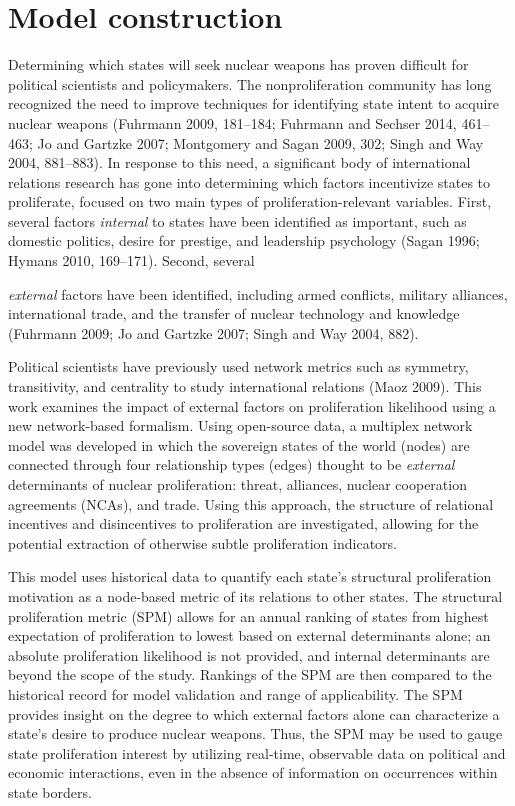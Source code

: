 \documentclass{article} %
\begin{document}
\section{Model construction}
Determining which states will seek nuclear weapons has proven difficult for political scientists and policymakers. The nonproliferation community has long recognized the need to improve techniques for identifying state intent to acquire nuclear weapons (Fuhrmann 2009, 181--184; Fuhrmann and Sechser 2014, 461--463; Jo and Gartzke 2007; Montgomery and Sagan 2009, 302; Singh and Way 2004, 881--883). In response to this need, a significant body of international relations research has gone into determining which factors incentivize states to proliferate, focused on two main types of proliferation-relevant variables. First, several factors {\textit{internal}} to states have been identified as important, such as domestic politics, desire for prestige, and leadership psychology (Sagan 1996; Hymans 2010, 169--171). Second, several {\textit{external} factors have been identified, including armed conflicts, military alliances, international trade, and the transfer of nuclear technology and knowledge (Fuhrmann 2009; Jo and Gartzke 2007; Singh and Way 2004, 882). 

Political scientists have previously used network metrics such as symmetry, transitivity, and centrality to study international relations (Maoz 2009). This work examines the impact of external factors on proliferation likelihood using a new network-based formalism. Using open-source data, a multiplex network model was developed in which the sovereign states of the world (nodes) are connected through four relationship types (edges) thought to be {\textit{external}} determinants of nuclear proliferation: threat, alliances, nuclear cooperation agreements (NCAs), and trade. Using this approach, the structure of relational incentives and disincentives to proliferation are investigated, allowing for the potential extraction of otherwise subtle proliferation indicators. 

This model uses historical data to quantify each state's structural proliferation motivation as a node-based metric of its relations to other states. The structural proliferation metric (SPM) allows for an annual ranking of states from highest expectation of proliferation to lowest based on external determinants alone; an absolute proliferation likelihood is not provided, and internal determinants are beyond the scope of the study. Rankings of the SPM are then compared to the historical record for model validation and range of applicability. The SPM provides insight on the degree to which external factors alone can characterize a state's desire to produce nuclear weapons. Thus, the SPM may be used to gauge state proliferation interest by utilizing real-time, observable data on political and economic interactions, even in the absence of information on occurrences within state borders.

}
\end{document}
